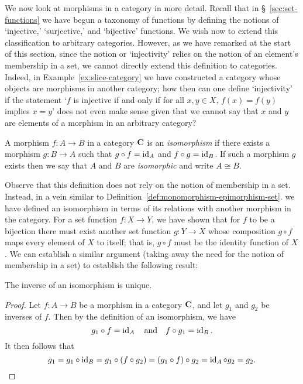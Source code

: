 We now look at morphisms in a category in more detail. Recall that in
\S~\ref{sec:set-functions} we have begun a taxonomy of functions by defining the
notions of `injective,' `surjective,' and `bijective' functions. We wish now to
extend this classification to arbitrary categories. However, as we have remarked
at the start of this section, since the notion or `injectivity' relies on the
notion of an element's membership in a set, we cannot directly extend this
definition to categories. Indeed, in Example~\ref{ex:slice-category} we have
constructed a category whose objects are morphisms in another category; how then
can one define `injectivity' if the statement `\(f\) is injective if and only if
for all \(x, y \in X\), \(f(x) = f(y)\) implies \(x = y\)' does not even make
sense given that we cannot say that \(x\) and \(y\) are elements of a morphism
in an arbitrary category? 

\begin{definition}[Isomorphism]
    A morphism \(f: A \to B\) in a category \(\mathbf{C}\) is an
    \emph{isomorphism} if there exists a morphism \(g: B \to A\) such that \(g
    \circ f = \operatorname{id}_A\) and \(f \circ g = \operatorname{id}_B\). If such a morphism \(g\) exists
    then we say that \(A\) and \(B\) are \emph{isomorphic} and write \(A \cong
    B\).
\end{definition}

Observe that this definition does not rely on the notion of membership in a set.
Instead, in a vein similar to Definition~\ref{def:monomorphism-epimorphism-set}.
we have defined an isomorphism in terms of its relations with another morphism
in the category. For a set function \(f : X \to Y\), we have shown that for
\(f\) to be a bijection there must exist another set function \(g: Y \to X\)
whose composition \(g \circ f\) maps every element of \(X\) to itself; that is,
\(g \circ f\) must be the identity function of \(X\). We can establish a similar
argument (taking away the need for the notion of membership in a set) to
establish the following result:

\begin{theorem}
    \label{thm:isomorphism-unique-inverse-category}
	The inverse of an isomorphism is unique.
\end{theorem}

\begin{proof}
	Let \(f : A \to B\) be a morphism in a category \(\mathbf{C}\), and let
	\(g_1\) and \(g_2\) be inverses of \(f\). Then by the definition of an
	isomorphism, we have
    \[
        g_1 \circ f = \operatorname{id}_A \quad \text{and} \quad f \circ g_1 = \operatorname{id}_B.
    \]
    It then follows that
    \[
        g_1 = g_1 \circ \operatorname{id}_B = g_1 \circ (f \circ g_2) = (g_1 \circ f) \circ g_2 = \operatorname{id}_A \circ g_2 = g_2.
    \]
\end{proof}

